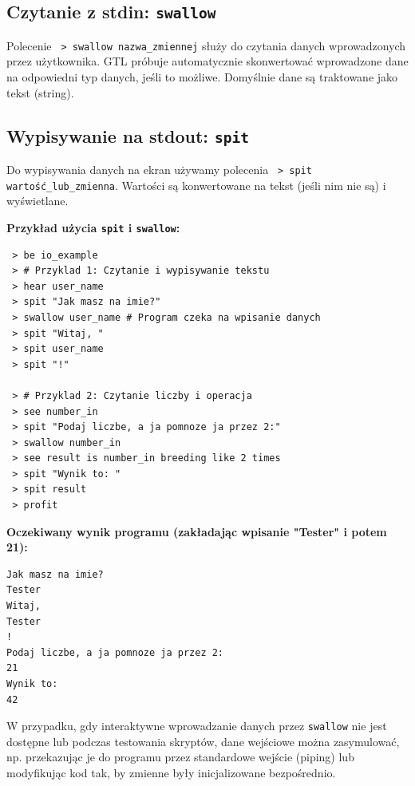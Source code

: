 \documentclass[12pt,a4paper]{article}
\begin{document}
\subsection{Czytanie z stdin: \texttt{swallow}}
Polecenie \texttt{ > swallow {nazwa\_zmiennej}} służy do czytania danych wprowadzonych przez użytkownika. GTL próbuje automatycznie skonwertować wprowadzone dane na odpowiedni typ danych, jeśli to możliwe. Domyślnie dane są traktowane jako tekst (string).

\subsection{Wypisywanie na stdout: \texttt{spit}}
Do wypisywania danych na ekran używamy polecenia \texttt{ > spit {wartość\_lub\_zmienna}}. Wartości są konwertowane na tekst (jeśli nim nie są) i wyświetlane.

\textbf{Przykład użycia \texttt{spit} i \texttt{swallow}:}
\begin{lstlisting}
 > be io_example
 > # Przyklad 1: Czytanie i wypisywanie tekstu
 > hear user_name
 > spit "Jak masz na imie?"
 > swallow user_name # Program czeka na wpisanie danych
 > spit "Witaj, "
 > spit user_name
 > spit "!"

 > # Przyklad 2: Czytanie liczby i operacja
 > see number_in
 > spit "Podaj liczbe, a ja pomnoze ja przez 2:"
 > swallow number_in
 > see result is number_in breeding like 2 times
 > spit "Wynik to: "
 > spit result
 > profit
\end{lstlisting}
\textbf{Oczekiwany wynik programu (zakładając wpisanie "Tester" i potem 21):}
\begin{verbatim}
Jak masz na imie?
Tester
Witaj,
Tester
!
Podaj liczbe, a ja pomnoze ja przez 2:
21
Wynik to:
42
\end{verbatim}
W przypadku, gdy interaktywne wprowadzanie danych przez \texttt{swallow} nie jest dostępne lub podczas testowania skryptów, dane wejściowe można zasymulować, np. przekazując je do programu przez standardowe wejście (piping) lub modyfikując kod tak, by zmienne były inicjalizowane bezpośrednio.
\end{document}

